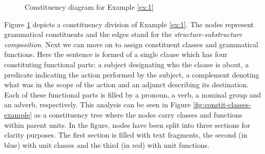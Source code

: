     \begin{figure}[!ht]
        \centering
        \caption{Constituency diagram for Example \ref{ex:1}}
        \label{fig:mcg-graph-example-simple-structure}
    \end{figure}
    
    Figure \ref{fig:mcg-graph-example-simple-structure} depicts a constituency division of Example \ref{ex:1}.%
    The nodes represent grammatical constituents and the edges stand for the \textit{structure-substructure composition}. 
    Next we can move on to assign constituent classes and grammatical functions. %
    Here the sentence is formed of a single clause which has four constituting functional parts: a subject designating who the clause is about, a predicate indicating the action performed by the subject, a complement denoting what was in the scope of the action and an adjunct describing its destination. Each of these functional parts is filled by a pronoun, a verb, a nominal group and an adverb, respectively. This analysis can be seen in Figure \ref{fig:constit-classes-example} as a constituency tree where the nodes carry classes and functions within parent units. In the figure, nodes have been split into three sections for clarity purposes. The first section is filled with text fragments, the second (in blue) with unit classes and the third (in red) with unit functions. 
    
